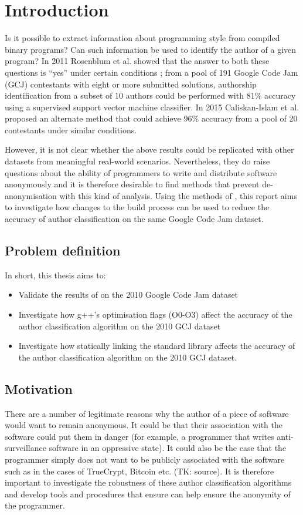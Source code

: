 \documentclass[a4paper,11pt]{kth-mag}
\begin{document}
\chapter{Introduction}
Is it possible to extract information about programming style from compiled
binary programs? Can such information be used to identify the author of a given
program? In 2011 Rosenblum et al. showed that the answer to both these
questions is “yes” under certain conditions \parencite{rosenblum2011wrote};
from a pool of 191 Google Code Jam (GCJ) contestants with eight or more
submitted solutions, authorship identification from a subset of 10 authors could
be performed with 81\% accuracy using a supervised support vector machine
classifier. In 2015 Caliskan-Islam et al. proposed an alternate method that
could achieve 96\% accuracy from a pool of 20 contestants
\parencite{caliskan2015coding} under similar conditions.

However, it is not clear whether the above results could be replicated with
other datasets from meaningful real-world scenarios. Nevertheless, they do
raise questions about the ability of programmers to write and distribute
software anonymously and it is therefore desirable to find methods that prevent
de-anonymisation with this kind of analysis. Using the methods of
\parencite{rosenblum2011wrote}, this report aims to investigate how changes to
the build process can be used to reduce the accuracy of author classification
on the same Google Code Jam dataset.

\section{Problem definition} In short, this thesis aims to:
\begin{itemize}
\item Validate the results of \parencite{rosenblum2011wrote} on the 2010 Google
      Code Jam dataset
\item Investigate how g++’s optimisation flags (O0-O3) affect the accuracy of
      the author classification algorithm on the 2010 GCJ dataset
\item Investigate how statically linking the standard library affects the
      accuracy of the author classification algorithm on the 2010 GCJ dataset.
\end{itemize}

\section{Motivation}
There are a number of legitimate reasons why the author of a piece of software
would want to remain anonymous. It could be that their association with the
software could put them in danger (for example, a programmer that writes
anti-surveillance software in an oppressive state). It could also be the case
that the programmer simply does not want to be publicly associated with the
software such as in the cases of TrueCrypt, Bitcoin etc. (TK: source). It is
therefore important to investigate the robustness of these author
classification algorithms and develop tools and procedures that ensure can help
ensure the anonymity of the programmer.
\end{document}
